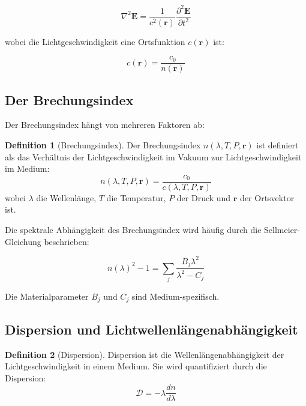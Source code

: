 \documentclass[a4paper,12pt]{article}
\theoremstyle{definition}
\newtheorem{definition}{Definition}[section]
\theoremstyle{remark}
\newcommand{\cLight}{c}
\newcommand{\refIndex}{n}
\begin{document}
\begin{equation}
    \nabla^2 \mathbf{E} = \frac{1}{\cLight^2(\mathbf{r})} \frac{\partial^2 \mathbf{E}}{\partial t^2}
\end{equation}

wobei die Lichtgeschwindigkeit eine Ortsfunktion $\cLight(\mathbf{r})$ ist:

\begin{equation}
    \cLight(\mathbf{r}) = \frac{\cLight_0}{\refIndex(\mathbf{r})}
\end{equation}

\subsection{Der Brechungsindex}

Der Brechungsindex hängt von mehreren Faktoren ab:

\begin{definition}[Brechungsindex]
Der Brechungsindex $\refIndex(\lambda, T, P, \mathbf{r})$ ist definiert als das Verhältnis der Lichtgeschwindigkeit im Vakuum zur Lichtgeschwindigkeit im Medium:
\begin{equation}
    \refIndex(\lambda, T, P, \mathbf{r}) = \frac{\cLight_0}{\cLight(\lambda, T, P, \mathbf{r})}
\end{equation}
wobei $\lambda$ die Wellenlänge, $T$ die Temperatur, $P$ der Druck und $\mathbf{r}$ der Ortsvektor ist.
\end{definition}

Die spektrale Abhängigkeit des Brechungsindex wird häufig durch die Sellmeier-Gleichung beschrieben:

\begin{equation}
    \refIndex(\lambda)^2 - 1 = \sum_{j} \frac{B_j \lambda^2}{\lambda^2 - C_j}
\end{equation}

Die Materialparameter $B_j$ und $C_j$ sind Medium-spezifisch.

\subsection{Dispersion und Lichtwellenlängenabhängigkeit}

\begin{definition}[Dispersion]
Dispersion ist die Wellenlängenabhängigkeit der Lichtgeschwindigkeit in einem Medium. Sie wird quantifiziert durch die Dispersion:
\begin{equation}
    \mathcal{D} = -\lambda \frac{d\refIndex}{d\lambda}
\end{equation}
\end{definition}
\end{document}
